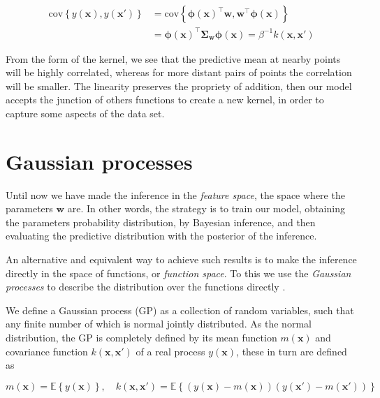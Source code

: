 \documentclass[11pt]{article} %
\begin{document}
\begin{equation}
   \begin{aligned}
      \mathrm{cov}\left\{ y(\mathbf{x}), y(\mathbf{x'})\right\} &=\mathrm{cov} \left\{ \boldsymbol{\phi}(\mathbf{x})^\top \mathbf{w}, \mathbf{w}^\top \boldsymbol{\phi}(\mathbf{x}) \right\} \\
       &= \boldsymbol{\phi}(\mathbf{x})^\top \boldsymbol{\Sigma}_\mathbf{w}\boldsymbol{\phi}(\mathbf{x}) = \beta^{-1}k(\mathbf{x},\mathbf{x'})
   \end{aligned}
\end{equation}

From the form of the kernel, we see that the predictive mean at nearby points will be highly correlated, whereas for more distant pairs of points the correlation will be smaller. The linearity preserves the propriety of addition, then our model accepts the junction of others functions to create a new kernel, in order to capture some aspects of the data set. 

\section{Gaussian processes}

Until now we have made the inference in the \textit{feature space}, the space where the parameters $\mathbf{w}$ are. In other words, the strategy is to train our model, obtaining the parameters probability distribution, by Bayesian inference, and then evaluating the predictive distribution with the posterior of the inference.

An alternative and equivalent way to achieve such results is to make the inference directly in the space of functions, or \textit{function space}. To this we use the \textit{Gaussian processes} to describe the distribution over the functions directly \cite{Rasmussen:2005:GPM:1162254}.

We define a Gaussian process (GP) as a collection of random variables, such that any finite number of which is normal jointly distributed. As the normal distribution, the GP is completely defined by its mean function $m(\mathbf{x})$ and covariance function $k(\mathbf{x},\mathbf{x'})$ of a real process $y(\mathbf{x})$, these in turn are defined as

\begin{equation}
   m(\mathbf{x}) = \mathbb{E}\left\{ y(\mathbf{x}) \right\}, \quad
   k(\mathbf{x},\mathbf{x'}) = \mathbb{E}\left\{ \left( y(\mathbf{x}) - m(\mathbf{x}) \right) \left( y(\mathbf{x'}) - m(\mathbf{x'}) \right) \right\}
\end{equation}
\end{document}

